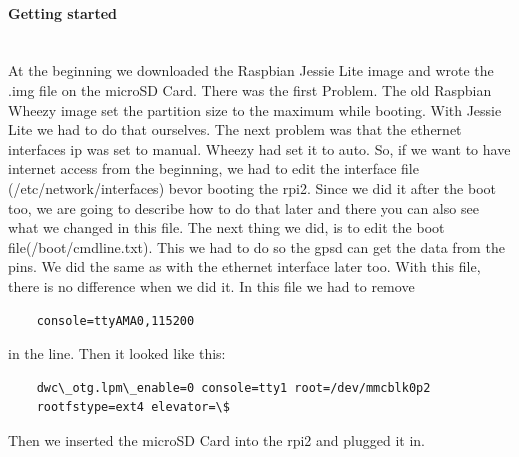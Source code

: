 \paragraph{Getting started} \mbox{}\\
At the beginning we downloaded the Raspbian Jessie Lite image and wrote the .img file on the microSD Card. \newline
There was the first Problem. \newline
The old Raspbian Wheezy image set the partition size to the maximum while booting. With Jessie Lite we had to do that ourselves. \newline
The next problem was that the ethernet interfaces \gls{ip} was set to manual. Wheezy had set it to auto. So, if we want to have internet access from the beginning, we had to edit the interface file (/etc/network/interfaces) bevor booting the \gls{rpi2}. Since we did it after the boot too, we are going to describe how to do that later and there you can also see what we changed in this file. \newline
The next thing we did, is to edit the boot file(/boot/cmdline.txt). This we had to do so the \gls{gpsd} can get the data from the pins. We did the same as with the ethernet interface later too. With this file, there is no difference when we did it. \newline
In this file we had to remove 
\begin{verbatim}
	console=ttyAMA0,115200
\end{verbatim}
in the line. \newline
Then it looked like this: 
\begin{verbatim}
	dwc\_otg.lpm\_enable=0 console=tty1 root=/dev/mmcblk0p2 
	rootfstype=ext4 elevator=\$ 
\end{verbatim}
Then we inserted the microSD Card into the \gls{rpi2} and plugged it in.

